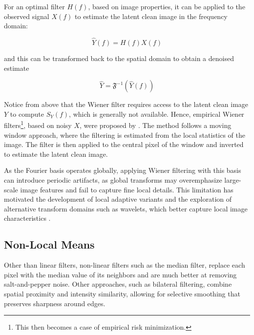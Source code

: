 For an optimal filter $H(f)$, based on image properties, it can be applied to the observed signal $X(f)$ to estimate the latent clean image in the frequency domain:

\begin{equation*}
    \hat{Y}(f) = H(f) X(f)
\end{equation*}

and this can be transformed back to the spatial domain to obtain a denoised estimate

\begin{equation*}
    \hat{Y} = \mathfrak{F}^{-1}(\hat{Y}(f))
\end{equation*}

Notice from above that the Wiener filter requires access to the latent clean image $Y$ to compute $S_Y(f)$, which is generally not available. Hence, empirical Wiener filters\footnote{This then becomes a case of empirical risk minimization.}, based on noisy $X$, were proposed by \citeauthor{yaroslavskyDigitalPictureProcessing1985} \cite{yaroslavskyDigitalPictureProcessing1985}. The method follows a moving window approach, where the filtering is estimated from the local statistics of the image. The filter is then applied to the central pixel of the window and inverted to estimate the latent clean image.

As the Fourier basis operates globally, applying Wiener filtering with this basis can introduce periodic artifacts, as global transforms may overemphasize large-scale image features and fail to capture fine local details. This limitation has motivated the development of local adaptive variants and the exploration of alternative transform domains such as wavelets, which better capture local image characteristics \cite{buadesReviewImageDenoising2005}.

\subsection{Non-Local Means}

Other than linear filters, non-linear filters such as the median filter, replace each pixel with the median value of its neighbors and are much better at removing salt-and-pepper noise. Other approaches, such as bilateral filtering, combine spatial proximity and intensity similarity, allowing for selective smoothing that  preserves sharpness around edges. 

